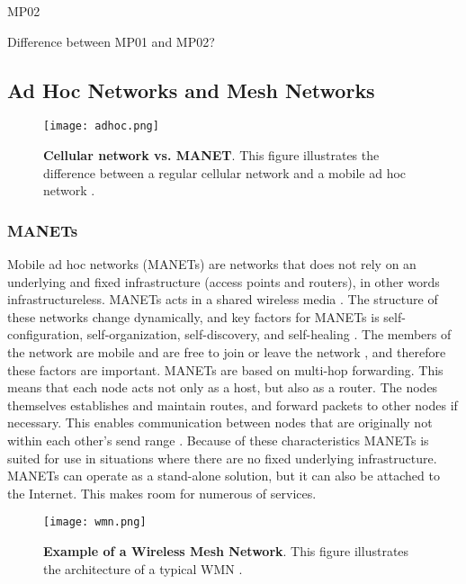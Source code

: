 MP02

Difference between MP01 and MP02?



\subsection{Ad Hoc Networks and Mesh Networks}

\begin{figure}[h!]
  \centering
    \texttt{[image: adhoc.png]}
     \caption [Cellular network vs. MANET]{\textbf{Cellular network vs. MANET}. This figure illustrates the difference between a regular cellular network and a mobile ad hoc network \cite{adhoc2}.}
\label{fig:adhoc}
\end{figure}

\subsubsection{MANETs} Mobile ad hoc networks (MANETs) are networks that does not rely on an underlying and fixed infrastructure (access points and routers), in other words infrastructureless. MANETs acts in a shared wireless media \cite{adhoc}. The structure of these networks change dynamically, and key factors for MANETs is self-configuration, self-organization, self-discovery, and self-healing \cite{wmn}. The members of the network are mobile and are free to join or leave the network \cite{adhoc2}, and therefore these factors are important. MANETs are based on multi-hop forwarding. This means that each node acts not only as a host, but also as a router. The nodes themselves establishes and maintain routes, and forward packets to other nodes if necessary. This enables communication between nodes that are originally not within each other's send range \cite{adhoc2}. Because of these characteristics MANETs is suited for use in situations where there are no fixed underlying infrastructure. MANETs can operate as a stand-alone solution, but it can also be attached to the Internet. This makes room for numerous of services. 

\begin{figure}[h!]
  \centering
    \texttt{[image: wmn.png]}
     \caption [Example of a Wireless Mesh Network]{\textbf{Example of a Wireless Mesh Network}. This figure illustrates the architecture of a typical WMN \cite{wmn}.}
\label{fig:wmn}
\end{figure}

